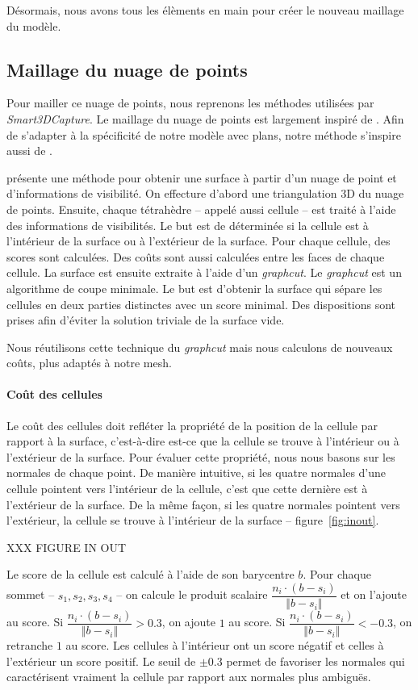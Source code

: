 \documentclass[12pt, twoside]{article}
\begin{document}
Désormais, nous avons tous les élèments en main pour créer le nouveau maillage du modèle.

\subsection{Maillage du nuage de points}
Pour mailler ce nuage de points, nous reprenons les méthodes utilisées par \textit{Smart3DCapture}. Le maillage du nuage de points est largement inspiré de \cite{maillage1}. Afin de s'adapter à la spécificité de notre modèle avec plans, notre méthode s'inspire aussi de \cite{maillage2}.

\cite{maillage1} présente une méthode pour obtenir une surface à partir d'un nuage de point et d'informations de visibilité. On effecture d'abord une triangulation 3D du nuage de points. Ensuite, chaque tétrahèdre -- appelé aussi cellule -- est traité à l'aide des informations de visibilités. Le but est de déterminée si la cellule est à l'intérieur de la surface ou à l'extérieur de la surface. Pour chaque cellule, des scores sont calculées. Des coûts sont aussi calculées entre les faces de chaque cellule. La surface est ensuite extraite à l'aide d'un \textit{graphcut}. Le \textit{graphcut} est un algorithme de coupe minimale. Le but est d'obtenir la surface qui sépare les cellules en deux parties distinctes avec un score minimal. Des dispositions sont prises afin d'éviter la solution triviale de la surface vide.

Nous réutilisons cette technique du \textit{graphcut} mais nous calculons de nouveaux coûts, plus adaptés à notre mesh.

\paragraph{Coût des cellules} Le coût des cellules doit refléter la propriété de la position de la cellule par rapport à la surface, c'est-à-dire est-ce que la cellule se trouve à l'intérieur ou à l'extérieur de la surface. Pour évaluer cette propriété, nous nous basons sur les normales de chaque point. De manière intuitive, si les quatre normales d'une cellule pointent vers l'intérieur de la cellule, c'est que cette dernière est à l'extérieur de la surface. De la même façon, si les quatre normales pointent vers l'extérieur, la cellule se trouve à l'intérieur de la surface -- figure~\ref{fig:inout}.

XXX FIGURE IN OUT

Le score de la cellule est calculé à l'aide de son barycentre $b$. Pour chaque sommet -- $s_1, s_2, s_3, s_4$ -- on calcule le produit scalaire $\dfrac{n_i\cdot(b-s_i)}{\Vert b-s_i\Vert}$ et on l'ajoute au score. Si $\dfrac{n_i\cdot(b-s_i)}{\Vert b-s_i\Vert} > 0.3$, on ajoute $1$ au score. Si $\dfrac{n_i\cdot(b-s_i)}{\Vert b-s_i\Vert} < -0.3$, on retranche $1$ au score. Les cellules à l'intérieur ont un score négatif et celles à l'extérieur un score positif. Le seuil de $\pm 0.3$ permet de favoriser les normales qui caractérisent vraiment la cellule par rapport aux normales plus ambiguës.
\end{document}

